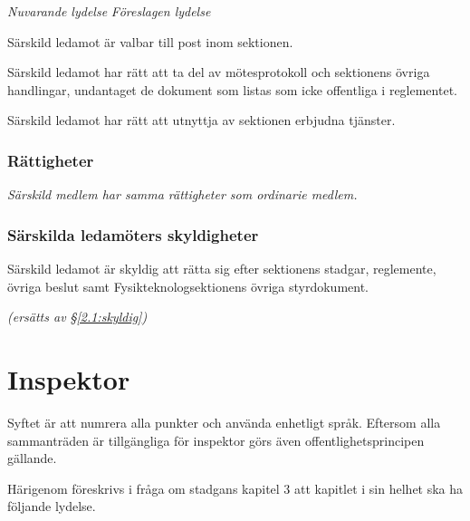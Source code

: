 \documentclass{article}
\newenvironment{lydelse}
    {\begin{paracol}{2}%
        \emph{Nuvarande lydelse}%
        \switchcolumn%
        \emph{Föreslagen lydelse}%
    \end{paracol}%
    \begin{enumerate}[label=\thesubsection.\arabic*]%
    \begin{paracol}{2}%
    }{\end{paracol}\end{enumerate}}
\newcommand{\itemb}{\item[\textbullet]}
\begin{document}
\begin{lydelse}
   \itemb Särskild ledamot är valbar till post inom sektionen.

   \itemb Särskild ledamot har rätt att ta del av mötesprotokoll och sektionens övriga handlingar, undantaget de dokument som listas som icke offentliga i reglementet.
   
   \itemb Särskild ledamot har rätt att utnyttja av sektionen erbjudna tjänster.
    
\switchcolumn
    \subsubsection*{Rättigheter}%

  


    \item \emph{Särskild medlem har samma rättigheter som ordinarie medlem.}

\switchcolumn*
    \subsubsection*{Särskilda ledamöters skyldigheter}%
    \itemb Särskild ledamot är skyldig att rätta sig efter sektionens stadgar, regle\-mente, övriga beslut samt  Fysikteknologsektionens övriga styrdokument.
    
\switchcolumn
    \emph{(ersätts av \S \ref{2.1:skyldig})}
\end{lydelse}

\section{Inspektor}
Syftet är att numrera alla punkter och använda enhetligt språk.
Eftersom alla sammanträden är tillgängliga för inspektor görs även offentlighetsprincipen gällande.

Härigenom föreskrivs i fråga om stadgans kapitel 3 att kapitlet i sin helhet ska ha följande lydelse.
\end{document}
